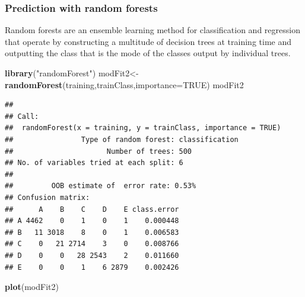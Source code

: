 \documentclass[]{article}
\newenvironment{Shaded}{\begin{snugshade}}{\end{snugshade}}
\newcommand{\KeywordTok}[1]{\textcolor[rgb]{0.13,0.29,0.53}{\textbf{{#1}}}}
\newcommand{\DataTypeTok}[1]{\textcolor[rgb]{0.13,0.29,0.53}{{#1}}}
\newcommand{\DecValTok}[1]{\textcolor[rgb]{0.00,0.00,0.81}{{#1}}}
\newcommand{\StringTok}[1]{\textcolor[rgb]{0.31,0.60,0.02}{{#1}}}
\newcommand{\OtherTok}[1]{\textcolor[rgb]{0.56,0.35,0.01}{{#1}}}
\newcommand{\NormalTok}[1]{{#1}}
\begin{document}
\begin{Shaded}
\end{Shaded}

\subsubsection{Prediction with random
forests}\label{prediction-with-random-forests}

Random forests are an ensemble learning method for classification and
regression that operate by constructing a multitude of decision trees at
training time and outputting the class that is the mode of the classes
output by individual trees.

\begin{Shaded}
\begin{Highlighting}[]
\KeywordTok{library}\NormalTok{(}\StringTok{"randomForest"}\NormalTok{)}
\NormalTok{modFit2<-}\KeywordTok{randomForest}\NormalTok{(training,trainClass,}\DataTypeTok{importance=}\OtherTok{TRUE}\NormalTok{)}
\NormalTok{modFit2}
\end{Highlighting}
\end{Shaded}

\begin{verbatim}
## 
## Call:
##  randomForest(x = training, y = trainClass, importance = TRUE) 
##                Type of random forest: classification
##                      Number of trees: 500
## No. of variables tried at each split: 6
## 
##         OOB estimate of  error rate: 0.53%
## Confusion matrix:
##      A    B    C    D    E class.error
## A 4462    0    1    0    1    0.000448
## B   11 3018    8    0    1    0.006583
## C    0   21 2714    3    0    0.008766
## D    0    0   28 2543    2    0.011660
## E    0    0    1    6 2879    0.002426
\end{verbatim}

\begin{Shaded}
\begin{Highlighting}[]
\KeywordTok{plot}\NormalTok{(modFit2)}
\end{Highlighting}
\end{Shaded}
\end{document}
